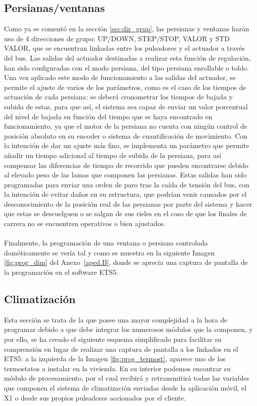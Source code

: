 \subsection{Persianas/ventanas}Como ya se comentó en la sección \ref{sec:dir_grup}, las persianas y ventanas harán uso de 4 direcciones de grupo: UP/DOWN, STEP/STOP, VALOR y STD VALOR, que se encuentran linkadas entre los pulsadores y el actuador a través del bus. Las salidas del actuador destinadas a realizar esta función de regulación, han sido configuradas con el modo persiana, del tipo persiana enrollable o toldo. Una vez aplicado este modo de funcionamiento a las salidas del actuador, se permite el ajuste de varios de los parámetros, como es el caso de los tiempos de actuación de cada persiana: se deberá cronometrar los tiempos de bajada y subida de estas, para que así, el sistema sea capaz de enviar un valor porcentual del nivel de bajada en función del tiempo que se haya encontrado en funcionamiento, ya que el motor de la persiana no cuenta con ningún control de posición absoluto en su encoder o sistema de cuantificación de movimiento. Con la intención de dar un ajuste más fino, se implementa un parámetro que permite añadir un tiempo adicional al tiempo de subida de la persiana, para así compensar las diferencias de tiempo de recorrido que pueden encontrarse debido al elevado peso de las lamas que componen las persianas. Estas salidas han sido programadas para enviar una orden de paro tras la caída de tensión del bus, con la intención de evitar daños en su estructura, que podrían venir causados por el desconocimiento de la posición real de las persianas por parte del sistema y hacer que estas se descuelguen o se salgan de sus rieles en el caso de que los finales de carrera no se encuentren operativos o bien ajustados.\\\\
Finalmente, la programación de una ventana o persiana controlada domóticamente se vería tal y como se muestra en la siguiente Imagen \ref{fig:prog_dim} del Anexo~\ref{aped.B}, donde se aprecia una captura de pantalla de la programación en el software ETS5.

\vspace{2cm}
\subsection{Climatización}Esta sección se trata de la que posee una mayor complejidad a la hora de programar debido a que debe integrar los numerosos módulos que la componen, y por ello, se ha creado el siguiente esquema simplificado para facilitar su comprensión en lugar de realizar una captura de pantalla a los linkados en el ETS5: a la izquierda de la Imagen \ref{fig:prog_termost}, aparece uno de los termostatos a instalar en la vivienda. En su interior podemos encontrar su módulo de procesamiento, por el cual recibirá y retransmitirá todas las variables que componen el sistema de climatización enviadas desde la aplicación móvil, el X1 o desde sus propios pulsadores accionados por el cliente. 
\newpage

